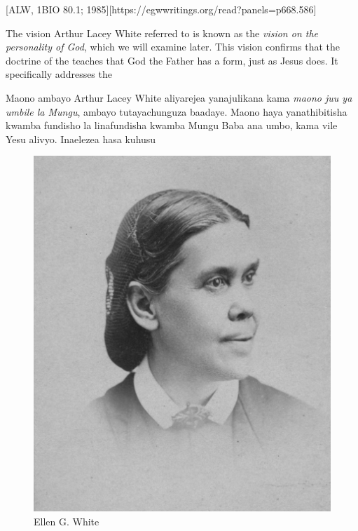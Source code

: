 [ALW, 1BIO 80.1; 1985][https://egwwritings.org/read?panels=p668.586]


The vision Arthur Lacey White referred to is known as the \textit{vision on the personality of God}, which we will examine later. This vision confirms that the doctrine of the  teaches that God the Father has a form, just as Jesus does. It specifically addresses the 


Maono ambayo Arthur Lacey White aliyarejea yanajulikana kama \textit{maono juu ya umbile la Mungu}, ambayo tutayachunguza baadaye. Maono haya yanathibitisha kwamba fundisho la  linafundisha kwamba Mungu Baba ana umbo, kama vile Yesu alivyo. Inaelezea hasa kuhusu 


\begin{figure}[t]
    \centering
    \includegraphics[width=0.65\linewidth]{images/ellen-white.jpg}
    \caption*{Ellen G. White}
    \label{fig:ellen-g-white}
\end{figure}


